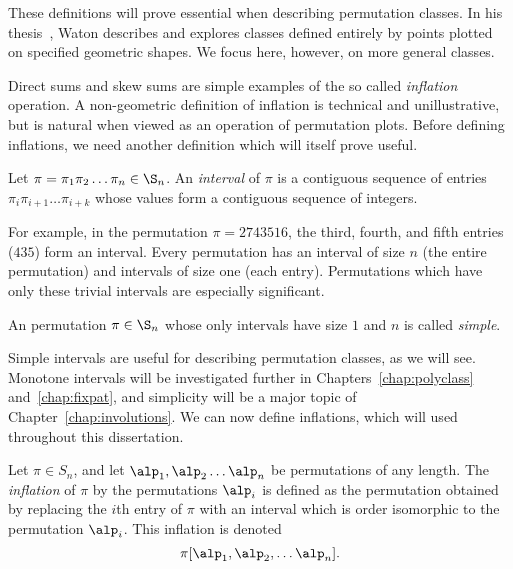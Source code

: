 \documentclass[12pt,twoside]{memoir}
\begin{document}
      These definitions will prove essential when describing permutation
      classes. In his thesis~\cite{SteveWaton2007}, Waton describes and explores
      classes defined entirely by points plotted on specified geometric shapes.
      We focus here, however, on more general classes. 

      Direct sums and skew sums are simple examples of the so called
      \emph{inflation} operation. A non-geometric definition of inflation is
      technical and unillustrative, but is natural when viewed as an operation of
      permutation plots. Before defining inflations, we need another definition
      which will itself prove useful. 

      \begin{definition}\label{prelim:def:interval}
        Let $\pi = \pi_1 \pi_2 \dots \pi_n \in \S_n$. An \emph{interval} of
        $\pi$ is a contiguous sequence of entries $\pi_i \pi_{i+1} \dots
        \pi_{i+k}$ whose values form a contiguous sequence of integers. 
      \end{definition}

      For example, in the permutation $\pi = 2743516$, the third,
      fourth, and fifth entries ($435$) form an interval. 
      Every permutation has an interval of size $n$ (the entire permutation) and
      intervals of size one (each entry).  Permutations which have only these
      trivial intervals are especially significant. 
      

      \begin{definition} \label{prelim:def:simple}
        An permutation $\pi \in \S_n$ whose only intervals have size $1$ and $n$ is
        called \emph{simple}. 
      \end{definition}
      
      Simple intervals are useful for describing permutation classes,
      as we will see.  Monotone intervals will be investigated further in
      Chapters~\ref{chap:polyclass} and~\ref{chap:fixpat},
      and simplicity will be a major topic of Chapter~\ref{chap:involutions}. We
      can now define inflations, which will used throughout this dissertation. 

      \begin{definition}\label{prelim:def:inflation}
        Let $\pi \in S_n$, and let $\alp_1, \alp_2 \dots \alp_n$ be 
        permutations of any length. The \emph{inflation} of $\pi$ by the
        permutations $\alp_i$ is defined as the permutation obtained by replacing
        the $i$th entry of $\pi$ with an interval which is order isomorphic to
        the permutation $\alp_i$.  This inflation is denoted 
        $$ \pi[\alp_1, \alp_2, \dots \alp_n].$$
      \end{definition}
\end{document}
